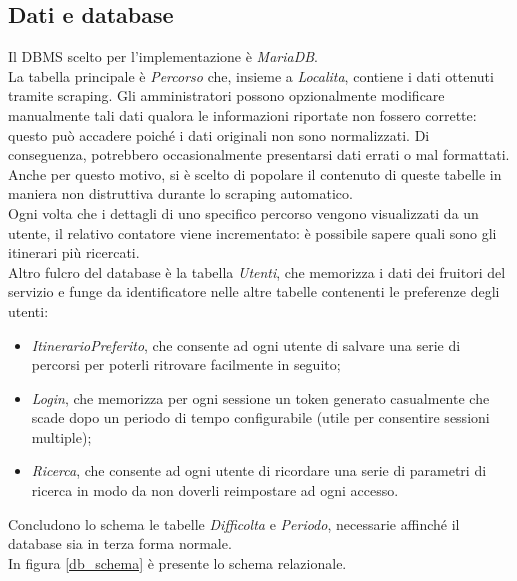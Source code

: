 \documentclass[11pt]{report}
\begin{document}
\subsection{Dati e database}
Il DBMS scelto per l'implementazione è \textit{MariaDB}.
\\La tabella principale è \textit{Percorso} che, insieme a \textit{Localita}, contiene i dati ottenuti tramite scraping.
Gli amministratori possono opzionalmente modificare manualmente tali dati qualora le informazioni riportate non fossero corrette: questo può accadere poiché i dati originali non sono normalizzati.
Di conseguenza, potrebbero occasionalmente presentarsi dati errati o mal formattati.
Anche per questo motivo, si è scelto di popolare il contenuto di queste tabelle in maniera non distruttiva durante lo scraping automatico.
\\Ogni volta che i dettagli di uno specifico percorso vengono visualizzati da un utente, il relativo contatore viene incrementato: è possibile sapere quali sono gli itinerari più ricercati.
\\Altro fulcro del database è la tabella \textit{Utenti}, che memorizza i dati dei fruitori del servizio e funge da identificatore nelle altre tabelle contenenti le preferenze degli utenti:
\begin{itemize}
	\item \textit{ItinerarioPreferito}, che consente ad ogni utente di salvare una serie di percorsi per poterli ritrovare facilmente in seguito;
	\item \textit{Login}, che memorizza per ogni sessione un token generato casualmente che scade dopo un periodo di tempo configurabile (utile per consentire sessioni multiple);
	\item \textit{Ricerca}, che consente ad ogni utente di ricordare una serie di parametri di ricerca in modo da non doverli reimpostare ad ogni accesso.
\end{itemize}
Concludono lo schema le tabelle \textit{Difficolta} e \textit{Periodo}, necessarie affinché il database sia in terza forma normale.
\\In figura \ref{db_schema} è presente lo schema relazionale.
\end{document}
